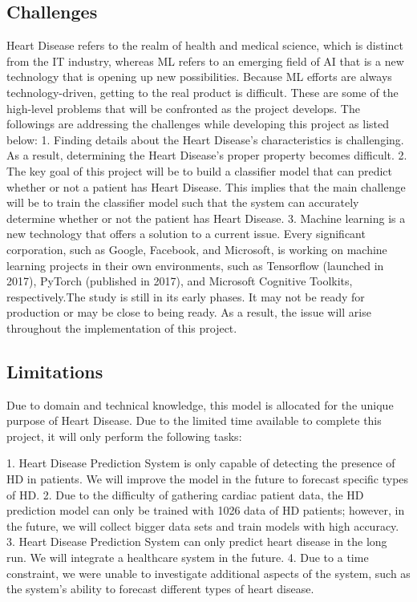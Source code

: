 \documentclass[12pt]{article}
\begin{document}
\subsection{Challenges}
Heart Disease refers to the realm of health and medical science, which is distinct from the IT industry, whereas ML refers to an emerging field of AI that is a new technology that is opening up new possibilities. Because ML efforts are always technology-driven, getting to the real product is difficult. These are some of the high-level problems that will be confronted as the project develops.
The followings are addressing the challenges while developing this project as listed below:
1.	Finding details about the Heart Disease's characteristics is challenging. As a result, determining the Heart Disease's proper property becomes difficult.
2. The key goal of this project will be to build a classifier model that can predict whether or not a patient has Heart Disease. This implies that the main challenge will be to train the classifier model such that the system can accurately determine whether or not the patient has	Heart Disease.
3.  	Machine learning is a new technology that offers a solution to a current issue. Every significant corporation, such as Google, Facebook, and Microsoft, is working on machine learning projects in their own environments, such as Tensorflow (launched in 2017), PyTorch (published in 2017), and Microsoft Cognitive Toolkits, respectively.The study is still in   its early phases. It may not be ready for production or may be close to being ready. As a result, the issue will arise throughout the implementation of this project.
 
\subsection{Limitations}
Due to domain and technical knowledge, this model is allocated for the unique purpose of Heart Disease. Due to the limited time available to complete this project, it will only perform the following tasks:
 
1.   Heart Disease Prediction System is only capable of detecting the presence of HD in patients. We will improve the model in the future to forecast specific types of HD.
2.      Due to the difficulty of gathering cardiac patient data, the HD prediction model can only be trained with 1026 data of HD patients; however, in the future, we will collect bigger data sets and train models with high accuracy.
3.  	Heart Disease Prediction System can only predict heart disease in the long run. We will integrate a healthcare system in the future.
4.  	Due to a time constraint, we were unable to investigate additional aspects of the system, such as the system's ability to forecast different types of heart disease.
 
\end{document}
